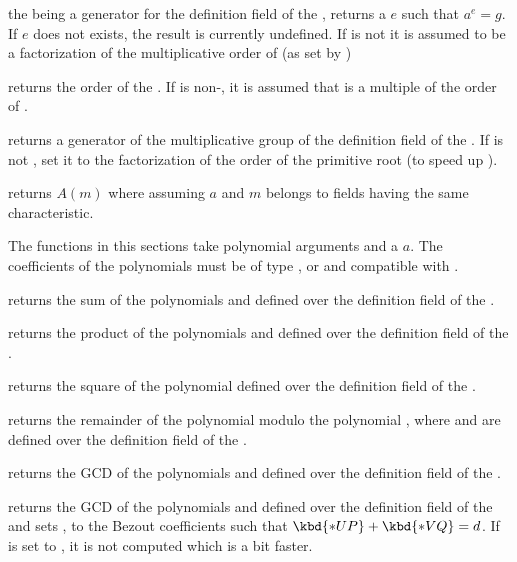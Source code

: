  the   being a
generator for the definition field of the  , returns a
 $e$ such that $a^e=g$.  If $e$ does not exists, the result is
currently undefined. If  is not  it is assumed to be a
factorization of the multiplicative order of  (as set by
)

 returns the order of the  .
If  is non-, it is assumed that  is a multiple of the
order of .

 returns a generator of the
multiplicative group of the definition field of the  .
If  is not , set it to the factorization of the order
of the primitive root (to speed up ).

 returns $A(m)$ where  assuming
$a$ and $m$ belongs to fields having the same characteristic.


The functions in this sections take polynomial arguments and a 
$a$. The coefficients of the polynomials must be of type ,
 or  and compatible with .

 returns the sum of the polynomials
 and  defined over the definition field of the 
.

 returns the product of the polynomials
 and  defined over the definition field of the 
.

 returns the square of the polynomial
 defined over the definition field of the  .

 returns the remainder
of the polynomial  modulo the polynomial , where  and
 are defined over the definition field of the  .

 returns the GCD of the polynomials
 and  defined over the definition field of the 
.

returns the GCD of the polynomials  and  defined over
the definition field of the   and sets ,  to
the Bezout coefficients such that $\kbd{*UP} + \kbd{*VQ} = d$.  If  is
set to , it is not computed which is a bit faster.

